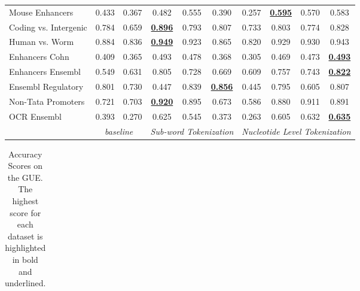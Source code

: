 \begin{table*}[h!]
\begin{center}
\begin{tabular}{l|cc|ccc|cccc}
Mouse Enhancers & 0.433 & 0.367 & 0.482 & 0.555 & 0.390 & 0.257 & {\ul \textbf{0.595}} & 0.570 & 0.583 \\
Coding vs. Intergenic & 0.784 & 0.659 & {\ul \textbf{0.896}} & 0.793 & 0.807 & 0.733 & 0.803 & 0.774 & 0.828 \\
Human vs. Worm & 0.884 & 0.836 & {\ul \textbf{0.949}} & 0.923 & 0.865 & 0.820 & 0.929 & 0.930 & 0.943 \\
Enhancers Cohn & 0.409 & 0.365 & 0.493 & 0.478 & 0.368 & 0.305 & 0.469 & 0.473 & {\ul \textbf{0.493}} \\
Enhancers Ensembl & 0.549 & 0.631 & 0.805 & 0.728 & 0.669 & 0.609 & 0.757 & 0.743 & {\ul \textbf{0.822}} \\
Ensembl Regulatory & 0.801 & 0.730 & 0.447 & 0.839 & {\ul \textbf{0.856}} & 0.445 & 0.795 & 0.605 & 0.807 \\
Non-Tata Promoters & 0.721 & 0.703 & {\ul \textbf{0.920}} & 0.895 & 0.673 & 0.586 & 0.880 & 0.911 & 0.891 \\
OCR Ensembl & 0.393 & 0.270 & 0.625 & 0.545 & 0.373 & 0.263 & 0.605 & 0.632 & {\ul \textbf{0.635}} \\
\hline
\multicolumn{1}{l|}{} & \multicolumn{2}{c|}{\textit{baseline}} & \multicolumn{3}{c|}{\textit{Sub-word Tokenization}} & \multicolumn{4}{c}{\textit{Nucleotide Level Tokenization}} \\ \hline
\end{tabular}
\end{center}
\end{table*}\begin{table*}[h!]
\small
\begin{center}
\caption{Accuracy Scores on the GUE. The highest score for each dataset is highlighted in bold and underlined.}
\label{table: GUE Results ACCURACY}
\begin{tabular}{l|cc|ccc|cccc}
\hline

\end{tabular}
\end{center}
\end{table*}
